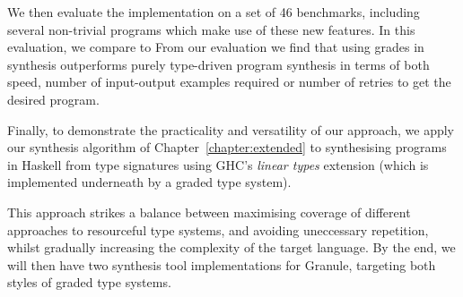 \begin{enumerate}
        We then evaluate the implementation on a set of 46 benchmarks, including
        several non-trivial programs which make use of these new features. In this
        evaluation, we compare to From our evaluation we find that using grades in
        synthesis outperforms purely type-driven program synthesis in terms of both
        speed, number of input-output examples required or number of retries to get the
        desired program.
        
        Finally, to demonstrate the practicality and versatility of our approach, we
        apply our synthesis algorithm of Chapter~\ref{chapter:extended} to synthesising
        programs in Haskell from type signatures using GHC's \emph{linear types}
        extension (which is implemented underneath by a graded type system).

\end{enumerate}


This approach strikes a balance between maximising coverage of different
approaches to resourceful type systems, and avoiding uneccessary repetition,
whilst gradually increasing the complexity of the target language. By the end, we
will then have two synthesis tool implementations for Granule, targeting both
styles of graded type systems.

